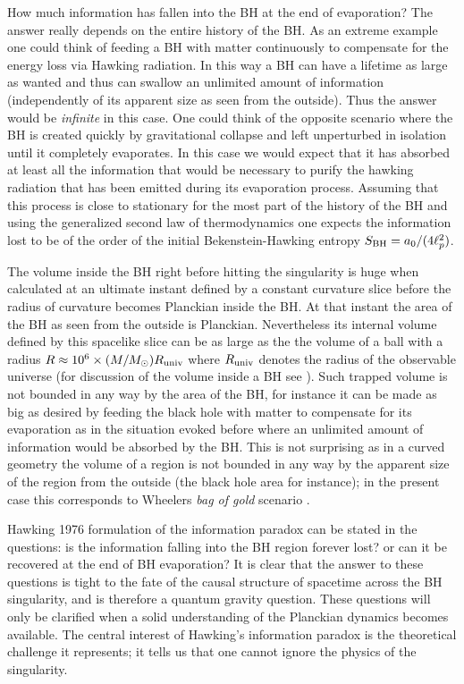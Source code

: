 \documentclass[aps, nofootinbib,superscriptaddress,12pt]{revtex4-2}
\begin{document}
\begin{figure}[ht]
\label{figu-info}
\end{figure}

How much information has fallen into the BH at the end of evaporation? The answer really depends on the entire history of the BH. As an extreme example one could think of feeding a BH with matter continuously to compensate for the energy loss via Hawking radiation. In this way a BH can have a lifetime as large as wanted and thus can swallow an unlimited amount of information (independently of its apparent size as seen from the outside). Thus the answer would be {\em infinite} in this case. One could think of the opposite scenario where the BH is created quickly by gravitational collapse and left unperturbed in isolation until it completely evaporates. In this case we would expect that it has absorbed at least all the information that would be necessary to purify the hawking radiation that has been emitted during its evaporation process. Assuming that this process is close to stationary for the most part of the history of the BH and using the generalized second law of thermodynamics one expects the information lost to be of the order of the initial Bekenstein-Hawking entropy 
$S_{\rm BH} = a_0/(4\ell_p^2)$.    
   
The volume inside the BH right before hitting the singularity is huge when calculated at an ultimate instant defined by a constant curvature 
slice before the radius of curvature becomes Planckian inside the BH. At that instant the area of the BH as seen from the outside is Planckian. Nevertheless its internal volume defined by this spacelike slice can be as large as the the volume of a ball with a radius
$R\approx 10^6 \times (M/M_{\odot}) R_{\rm univ}$ where $R_{\rm univ}$ denotes the radius of the observable universe (for discussion of the volume inside a BH see \cite{ Christodoulou:2014yia, Christodoulou:2016tuu}). Such trapped volume is not bounded in any way by the area of the BH, for instance it can be made as big as desired by feeding the black hole with matter to compensate for its evaporation as in the situation evoked before where an unlimited amount of information would be absorbed by the BH. This is not 
surprising as in a curved geometry the volume of a region is not bounded in any way by the apparent size of the region from the outside (the black hole area for instance); in the present case this corresponds to Wheelers {\em bag of gold} scenario \cite{Whee}. 

Hawking 1976 \cite{Hawking:1976ra} formulation of the information paradox can be stated in the questions: is the information falling into the BH region forever lost? 
or can it be recovered at the end of BH evaporation? It is clear that the answer to these questions is tight to the fate of the causal structure of spacetime across the BH singularity, and is therefore a quantum gravity question.  These questions will only be clarified when a solid understanding of the Planckian dynamics becomes 
available. The central interest of Hawking's information paradox is the theoretical challenge it represents; it tells us that one cannot ignore the physics of the singularity.
\end{document}
